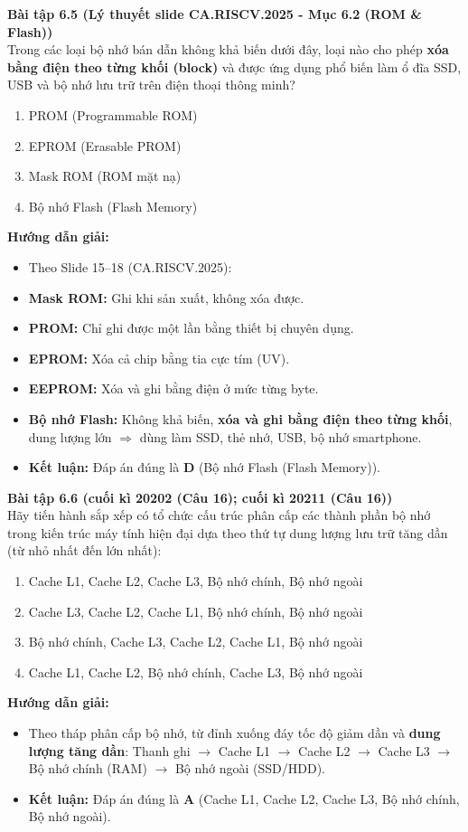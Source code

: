\textbf{Bài tập 6.5 (Lý thuyết slide CA.RISCV.2025 - Mục 6.2 (ROM \& Flash))}\\
Trong các loại bộ nhớ bán dẫn không khả biến dưới đây, loại nào cho phép \textbf{xóa bằng điện theo từng khối (block)} và được ứng dụng phổ biến làm ổ đĩa SSD, USB và bộ nhớ lưu trữ trên điện thoại thông minh?
\begin{enumerate}[label=\Alph*.]
    \item PROM (Programmable ROM)
    \item EPROM (Erasable PROM)
    \item Mask ROM (ROM mặt nạ)
    \item Bộ nhớ Flash (Flash Memory)
\end{enumerate}
\textbf{Hướng dẫn giải:}
\begin{itemize}
    \item Theo Slide 15--18 (CA.RISCV.2025):
    \item \textbf{Mask ROM:} Ghi khi sản xuất, không xóa được.
    \item \textbf{PROM:} Chỉ ghi được một lần bằng thiết bị chuyên dụng.
    \item \textbf{EPROM:} Xóa cả chip bằng tia cực tím (UV).
    \item \textbf{EEPROM:} Xóa và ghi bằng điện ở mức từng byte.
    \item \textbf{Bộ nhớ Flash:} Không khả biến, \textbf{xóa và ghi bằng điện theo từng khối}, dung lượng lớn $\Rightarrow$ dùng làm SSD, thẻ nhớ, USB, bộ nhớ smartphone.
    \item \textbf{Kết luận:} Đáp án đúng là \textbf{D} (Bộ nhớ Flash (Flash Memory)).
\end{itemize}

\textbf{Bài tập 6.6 (cuối kì 20202 (Câu 16); cuối kì 20211 (Câu 16))}\\
Hãy tiến hành sắp xếp có tổ chức cấu trúc phân cấp các thành phần bộ nhớ trong kiến trúc máy tính hiện đại dựa theo thứ tự dung lượng lưu trữ tăng dần (từ nhỏ nhất đến lớn nhất):
\begin{enumerate}[label=\Alph*.]
    \item Cache L1, Cache L2, Cache L3, Bộ nhớ chính, Bộ nhớ ngoài
    \item Cache L3, Cache L2, Cache L1, Bộ nhớ chính, Bộ nhớ ngoài
    \item Bộ nhớ chính, Cache L3, Cache L2, Cache L1, Bộ nhớ ngoài
    \item Cache L1, Cache L2, Bộ nhớ chính, Cache L3, Bộ nhớ ngoài
\end{enumerate}
\textbf{Hướng dẫn giải:}
\begin{itemize}
    \item Theo tháp phân cấp bộ nhớ, từ đỉnh xuống đáy tốc độ giảm dần và \textbf{dung lượng tăng dần}: Thanh ghi $\rightarrow$ Cache L1 $\rightarrow$ Cache L2 $\rightarrow$ Cache L3 $\rightarrow$ Bộ nhớ chính (RAM) $\rightarrow$ Bộ nhớ ngoài (SSD/HDD).
    \item \textbf{Kết luận:} Đáp án đúng là \textbf{A} (Cache L1, Cache L2, Cache L3, Bộ nhớ chính, Bộ nhớ ngoài).
\end{itemize}

